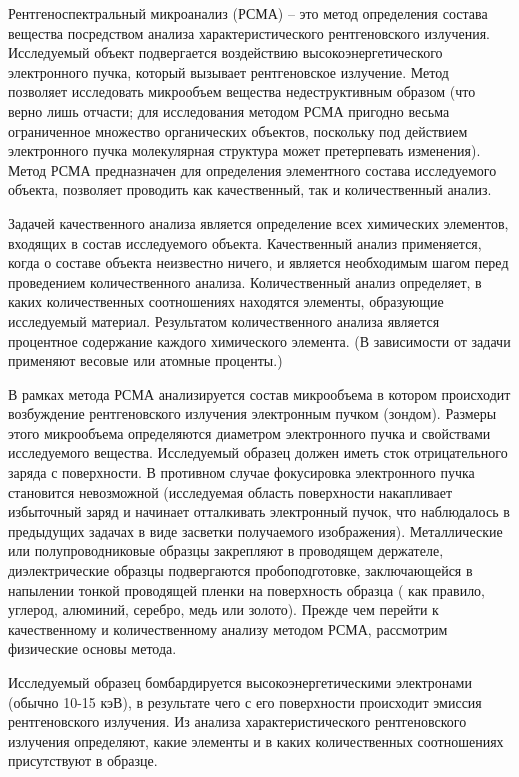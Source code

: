 \documentclass[14pt]{extarticle}
\begin{document}
Рентгеноспектральный микроанализ (РСМА) -- это метод определения состава вещества посредством анализа характеристического рентгеновского излучения. Исследуемый объект подвергается воздействию высокоэнергетического электронного пучка, который вызывает рентгеновское излучение. Метод позволяет исследовать микрообъем вещества недеструктивным образом (что верно лишь отчасти; для исследования методом РСМА пригодно весьма ограниченное множество органических объектов, поскольку под действием электронного пучка молекулярная структура может претерпевать изменения). Метод РСМА предназначен для определения элементного состава исследуемого объекта, позволяет проводить как качественный, так и количественный анализ. \par
Задачей качественного анализа является определение всех химических элементов, входящих в состав исследуемого объекта. Качественный анализ применяется, когда о составе объекта неизвестно ничего, и является необходимым шагом перед проведением количественного анализа. Количественный анализ определяет, в каких количественных соотношениях находятся элементы, образующие исследуемый материал. Результатом количественного анализа является процентное содержание каждого химического элемента. (В зависимости от задачи применяют весовые или атомные проценты.) \par
В рамках метода РСМА анализируется состав микрообъема в котором происходит возбуждение рентгеновского излучения электронным пучком (зондом). Размеры этого микрообъема определяются диаметром электронного пучка и свойствами исследуемого вещества. Исследуемый образец должен иметь сток отрицательного заряда с поверхности. В противном случае фокусировка электронного пучка становится невозможной (исследуемая область поверхности накапливает избыточный заряд и начинает отталкивать электронный пучок, что наблюдалось в предыдущих задачах в виде засветки получаемого изображения). Металлические или полупроводниковые образцы закрепляют в проводящем держателе, диэлектрические образцы подвергаются пробоподготовке, заключающейся в напылении тонкой проводящей пленки на поверхность образца ( как правило, углерод, алюминий, серебро, медь или золото). Прежде чем перейти к качественному и количественному анализу методом РСМА, рассмотрим физические основы метода. \par
	Исследуемый образец бомбардируется высокоэнергетическими электронами (обычно 10-15 кэВ), в результате чего с его поверхности происходит эмиссия рентгеновского излучения. Из анализа характеристического рентгеновского излучения определяют, какие элементы и в каких количественных соотношениях присутствуют в образце. 
\end{document}
